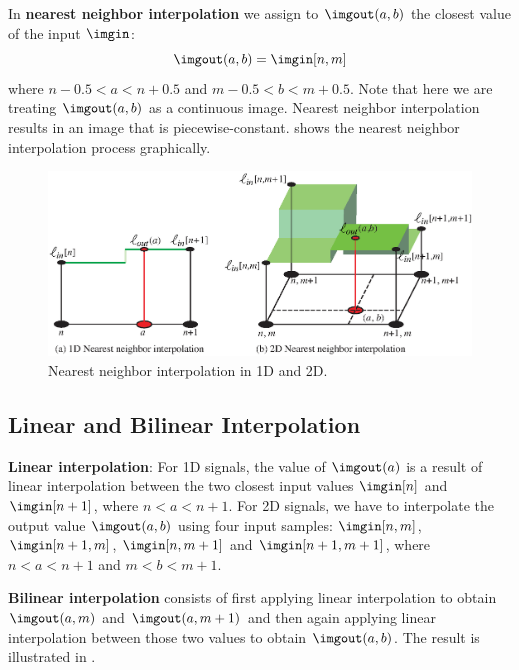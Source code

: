 In {\bf nearest neighbor interpolation} we assign to $\imgout(a,b)$ the closest value of the input $\imgin$:
\begin{equation}
\imgout(a,b) = \imgin [ n, m ] 
\end{equation}
where $n-0.5<a<n+0.5$ and $m-0.5<b<m+0.5$. Note that here we are treating $\imgout(a,b)$ as a continuous image. Nearest neighbor interpolation results in an image that is piecewise-constant. \Fig{\ref{fig:upsampling_and_downsampling:nn_interp}} shows the nearest neighbor interpolation process graphically.
\begin{figure}[h!]
\centerline{
\includegraphics[width=1\linewidth]{figures/upsamplig_downsampling/nearest_interp2.eps}
}
\caption{Nearest neighbor interpolation in 1D and 2D.}
\label{fig:upsampling_and_downsampling:nn_interp}
\end{figure}

\subsection{Linear and Bilinear Interpolation}
\label{sec:bilinearinterpolation}

{\bf Linear interpolation}: For 1D signals, the value of $\imgout(a)$ is a result of linear interpolation between the two closest input values $\imgin [n]$ and $\imgin [n+1]$, where $n<a<n+1$. 
For 2D signals, we have to interpolate the output value $\imgout(a,b)$ using four input samples: $\imgin [ n,m ]$, $\imgin [ n+1,m ]$, $\imgin [ n,m+1 ]$ and $\imgin [ n+1,m+1 ]$, where $n<a<n+1$ and $m<b<m+1$. 

{\bf Bilinear interpolation} consists of first applying linear interpolation to obtain $\imgout(a,m)$ and $\imgout(a,m+1)$ and then again applying linear interpolation between those two values to obtain $\imgout(a,b)$. The result is illustrated in \fig{\ref{fig:bilinear_interp}}.

